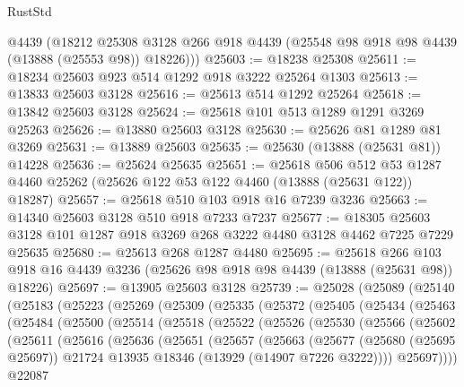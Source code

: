 \begin{lexlean}{RustStd}
\begin{coremodule}
      @4439
      (@18212
        @25308
        @3128
        @266
        @918
        @4439
        (@25548 @98 @918 @98 @4439 (@13888 (@25553 @98)) @18226)))
@25603 := @18238 @25308
@25611 := @18234 @25603 @923 @514 @1292 @918 @3222 @25264 @1303
@25613 := @13833 @25603 @3128
@25616 := @25613 @514 @1292 @25264
@25618 := @13842 @25603 @3128
@25624 := @25618 @101 @513 @1289 @1291 @3269 @25263
@25626 := @13880 @25603 @3128
@25630 := @25626 @81 @1289 @81 @3269
@25631 := @13889 @25603
@25635 := @25630 (@13888 (@25631 @81)) @14228
@25636 := @25624 @25635
@25651 := @25618
    @506
    @512
    @53
    @1287
    @4460
    @25262
    (@25626 @122 @53 @122 @4460 (@13888 (@25631 @122)) @18287)
@25657 := @25618 @510 @103 @918 @16 @7239 @3236
@25663 := @14340 @25603 @3128 @510 @918 @7233 @7237
@25677 := @18305 @25603 @3128 @101 @1287 @918 @3269 @268 @3222 @4480 @3128 @4462 @7225 @7229 @25635
@25680 := @25613 @268 @1287 @4480
@25695 := @25618
    @266
    @103
    @918
    @16
    @4439
    @3236
    (@25626 @98 @918 @98 @4439 (@13888 (@25631 @98)) @18226)
@25697 := @13905 @25603 @3128
@25739 := @25028
    (@25089
      (@25140
        (@25183
          (@25223
            (@25269
              (@25309
                (@25335
                  (@25372
                    (@25405
                      (@25434
                        (@25463
                          (@25484
                            (@25500
                              (@25514
                                (@25518
                                  (@25522
                                    (@25526
                                      (@25530
                                        (@25566
                                          (@25602
                                            (@25611
                                              (@25616
                                                (@25636
                                                  (@25651
                                                    (@25657
                                                      (@25663
                                                        (@25677
                                                          (@25680 (@25695 @25697))
                                                          @21724
                                                          @13935
                                                          @18346
                                                          (@13929 (@14907 @7226 @3222))))
                                                      @25697))))
                                              @22087

\end{coremodule}
\end{lexlean}
